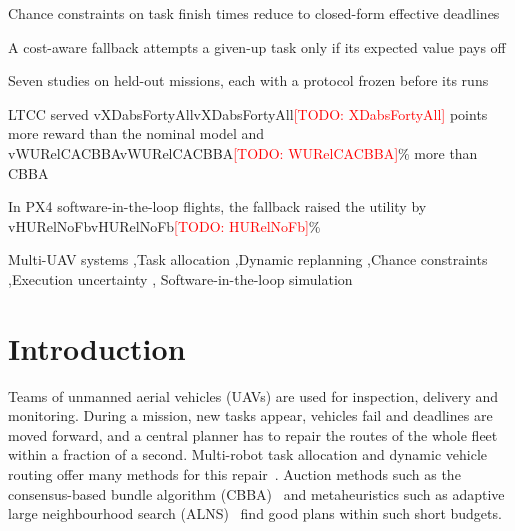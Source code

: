 \documentclass[a4paper,fleqn]{cas-dc}
\newcommand{\todo}[1]{\textcolor{red}{[TODO: #1]}}
\newcommand{\val}[1]{\ifcsname v#1\endcsname\csname v#1\endcsname\else\todo{#1}\fi}
\begin{document}
\begin{highlights}
\item Chance constraints on task finish times reduce to closed-form effective deadlines
\item A cost-aware fallback attempts a given-up task only if its expected value pays off
\item Seven studies on held-out missions, each with a protocol frozen before its runs
\item LTCC served \val{XDabsFortyAll} points more reward than the nominal model and \val{WURelCACBBA}\% more than CBBA
\item In PX4 software-in-the-loop flights, the fallback raised the utility by \val{HURelNoFb}\%
\end{highlights}

\begin{keywords}
Multi-UAV systems \sep Task allocation \sep Dynamic replanning \sep Chance constraints \sep Execution uncertainty \sep
Software-in-the-loop simulation
\end{keywords}

\maketitle

\section{Introduction}\label{sec:intro}
Teams of unmanned aerial vehicles (UAVs) are used for inspection, delivery and monitoring. During a mission, new tasks
appear, vehicles fail and deadlines are moved forward, and a central planner has to repair the routes of the whole fleet
within a fraction of a second. Multi-robot task allocation and dynamic vehicle routing offer many methods for this
repair~\cite{gerkey2004formal,psaraftis2016dynamic,soeffker2022review,skaltsis2023review}. Auction methods such as the
consensus-based bundle algorithm (CBBA)~\cite{choi2009consensus} and metaheuristics such as adaptive large
neighbourhood search (ALNS)~\cite{ropke2006adaptive} find good plans within such short budgets.
\end{document}
